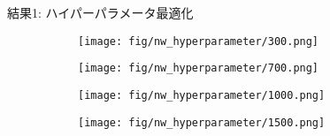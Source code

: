 \documentclass[xelatex, 8pt]{beamer}
\theoremstyle{plain}
\theoremstyle{definition}
\begin{document}
\begin{frame}{結果1: ハイパーパラメータ最適化}

\begin{figure}
    \centering
    \begin{subfigure}{0.45\textwidth}
        \centering
        \texttt{[image: fig/nw\_hyperparameter/300.png]}
        \label{fig:sigma300}
    \end{subfigure}
    \hfill
    \begin{subfigure}{0.45\textwidth}
        \centering
        \texttt{[image: fig/nw\_hyperparameter/700.png]}
        \label{fig:sigma700}
    \end{subfigure}

    \begin{subfigure}{0.45\textwidth}
        \centering
        \texttt{[image: fig/nw\_hyperparameter/1000.png]}
        \label{fig:sigma1000}
    \end{subfigure}
        \hfill
    \begin{subfigure}{0.45\textwidth}
        \centering
        \texttt{[image: fig/nw\_hyperparameter/1500.png]}
        \label{fig:sigma1500}
    \end{subfigure}
\end{figure}

\end{frame}
\end{document}
